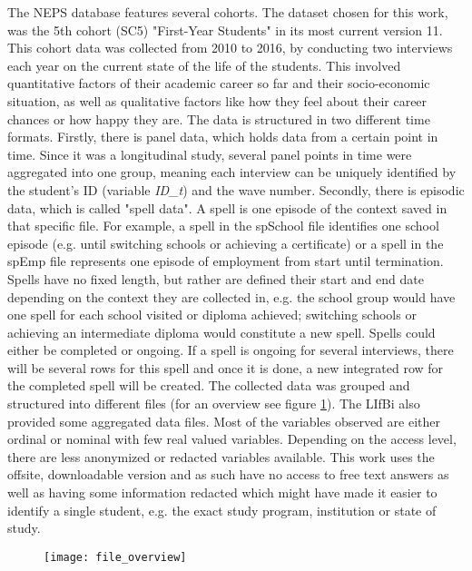 The NEPS database features several cohorts. The dataset chosen for this work, was the 5th cohort (SC5) "First-Year Students" in its most current version 11. This cohort data was collected from 2010 to 2016, by conducting two interviews each year on the current state of the life of the students. This involved quantitative factors of their academic career so far and their socio-economic situation, as well as qualitative factors like how they feel about their career chances or how happy they are. The data is structured in two different time formats. Firstly, there is panel data, which holds data from a certain point in time. Since it was a longitudinal study, several panel points in time were aggregated into one group, meaning each interview can be uniquely identified by the student's ID (variable \textit{ID\_t}) and the wave number. Secondly, there is episodic data, which is called "spell data". A spell is one episode of the context saved in that specific file. For example, a spell in the spSchool file identifies one school episode (e.g. until switching schools or achieving a certificate) or a spell in the spEmp file represents one episode of employment from start until termination. Spells have no fixed length, but rather are defined their start and end date depending on the context they are collected in, e.g. the school group would have one spell for each school visited or diploma achieved; switching schools or achieving an intermediate diploma would constitute a new spell. Spells could either be completed or ongoing. If a spell is ongoing for several interviews, there will be several rows for this spell and once it is done, a new integrated row for the completed spell will be created. 
The collected data was grouped and structured into different files (for an overview see figure \ref{fig:file_overview}). The LIfBi also provided some aggregated data files. Most of the variables observed are either ordinal or nominal with few real valued variables. %
Depending on the access level, there are less anonymized or redacted variables available. This work uses the offsite, downloadable version and as such have no access to free text answers as well as having some information redacted which might have made it easier to identify a single student, e.g. the exact study program, institution or state of study.
\begin{figure}[ht]
    \centering
    \texttt{[image: file\_overview]}
    \label{fig:file_overview}
\end{figure}
